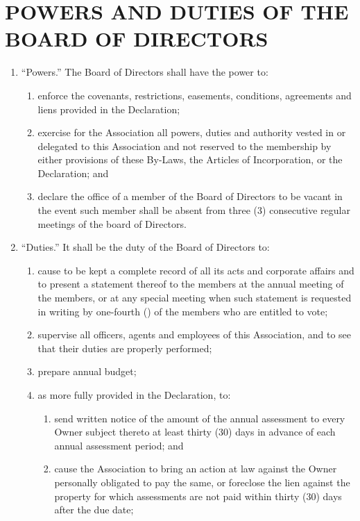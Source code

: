 \documentclass[10pt, letterpaper]{article}
\begin{document}
\section{POWERS AND DUTIES OF THE BOARD OF DIRECTORS}
\begin{enumerate}
  \item ``Powers.''
    The Board of Directors shall have the power to:
    \begin{enumerate}
      \item enforce the covenants, restrictions, easements, conditions, agreements and liens provided in the Declaration;
      \item exercise for the Association all powers, duties and authority vested in or delegated to this Association and not reserved to the membership by either provisions of these By-Laws, the Articles of Incorporation, or the Declaration; and
      \item declare the office of a member of the Board of Directors to be vacant in the event such member shall be absent from three (3) consecutive regular meetings of the board of Directors.
    \end{enumerate}
  \item ``Duties.''
    It shall be the duty of the Board of Directors to:
    \begin{enumerate}
      \item cause to be kept a complete record of all its acts and corporate affairs and to present a statement thereof to the members at the annual meeting of the members, or at any special meeting when such statement is requested in writing by one-fourth (\textonequarter) of the members who are entitled to vote;
      \item supervise all officers, agents and employees of this Association, and to see that their duties are properly performed;
      \item prepare annual budget;
      \item as more fully provided in the Declaration, to:
        \begin{enumerate}
          \item send written notice of the amount of the annual assessment to every Owner subject thereto at least thirty (30) days in advance of each annual assessment period; and
          \item cause the Association to bring an action at law against the Owner personally obligated to pay the same, or foreclose the lien against the property for which assessments are not paid within thirty (30) days after the due date;

\end{enumerate}
\end{enumerate}
\end{enumerate}
\end{document}
